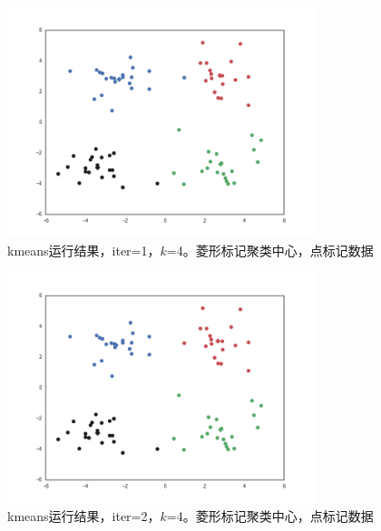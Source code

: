 \documentclass{ctexart}
\begin{document}
\begin{figure}[H]
\begin{center}
\includegraphics[width=0.8\textwidth]{fig/iter-01.png} %
\caption{kmeans运行结果，iter=1，$k$=4。菱形标记聚类中心，点标记数据}
\end{center}
\end{figure}


\begin{figure}[H]
\begin{center}
\includegraphics[width=0.8\textwidth]{fig/iter-02.png} %
\caption{kmeans运行结果，iter=2，$k$=4。菱形标记聚类中心，点标记数据}
\end{center}
\end{figure}
\end{document}
